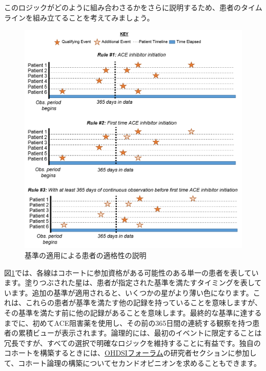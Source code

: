 \documentclass[
  11pt]{book}
\theoremstyle{definition}
\theoremstyle{definition}
\theoremstyle{definition}
\theoremstyle{definition}
\theoremstyle{remark}
\begin{document}
このロジックがどのように組み合わさるかをさらに説明するため、患者のタイムラインを組み立てることを考えてみましょう。

\begin{figure}

{\centering \includegraphics[width=1\linewidth]{images/Cohorts/EarliestEventExplained} 

}

\caption{基準の適用による患者の適格性の説明}\label{fig:EarliestEventExplained}
\end{figure}

図\ref{fig:EarliestEventExplained}では、各線はコホートに参加資格がある可能性のある単一の患者を表しています。塗りつぶされた星は、患者が指定された基準を満たすタイミングを表しています。追加の基準が適用されると、いくつかの星がより薄い色になります。これは、これらの患者が基準を満たす他の記録を持っていることを意味しますが、その基準を満たす前に他の記録があることを意味します。最終的な基準に達するまでに、初めてACE阻害薬を使用し、その前の365日間の連続する観察を持つ患者の累積ビューが表示されます。論理的には、最初のイベントに限定することは冗長ですが、すべての選択で明確なロジックを維持することに有益です。独自のコホートを構築するときには、\href{http://forums.ohdsi.org}{OHDSIフォーラム}の研究者セクションに参加して、コホート論理の構築についてセカンドオピニオンを求めることもできます。
\end{document}
